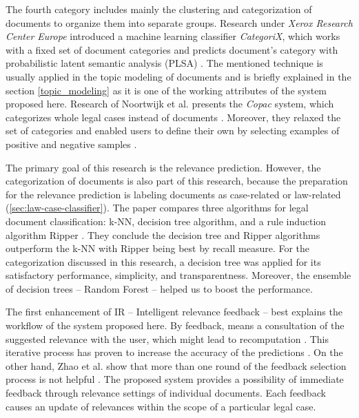 \documentclass[
  digital, %
  notable,   %
  nolof,     %
  nolot,     %
]{fithesis3}
\begin{document}
The fourth category includes mainly the clustering and categorization of documents to organize them into separate groups.
Research under \textit{Xerox Research Center Europe} introduced a machine learning classifier \textit{CategoriX}, which works with a fixed set of document categories and predicts document's category with probabilistic latent semantic analysis (PLSA) \cite{barnett2009classification}.
The mentioned technique is usually applied in the topic modeling of documents and is briefly explained in the section \ref{topic_modeling} as it is one of the working attributes of the system proposed here.
Research of Noortwijk et al. presents the \textit{Copac} system, which categorizes whole legal cases instead of documents \cite{van2006ranking}.
Moreover, they relaxed the set of categories and enabled users to define their own by selecting examples of positive and negative samples \cite{van2006ranking}.

The primary goal of this research is the relevance prediction.
However, the categorization of documents is also part of this research, because the preparation for the relevance prediction is labeling documents as case-related or law-related (\ref{sec:law-case-classifier}).
The paper  compares three algorithms for legal document classification: k-NN, decision tree algorithm, and a rule induction algorithm Ripper \cite{thompson2001automatic}.
They conclude the decision tree and Ripper algorithms outperform the k-NN with Ripper being best by recall measure.
For the categorization discussed in this research, a decision tree was applied for its satisfactory performance, simplicity, and transparentness.
Moreover, the ensemble of decision trees -- Random Forest -- helped us to boost the performance.

The first enhancement of IR -- Intelligent relevance feedback -- best explains the workflow of the system proposed here.
By feedback, \citeauthor{Conrad2010ediscovery} means a consultation of the suggested relevance with the user, which might lead to recomputation \cite{Conrad2010ediscovery}.
This iterative process has proven to increase the accuracy of the predictions \cite{Conrad2010ediscovery}.
On the other hand, Zhao et al. show that more than one round of the feedback selection process is not helpful \cite{zhao2009feedback}.
The proposed system provides a possibility of immediate feedback through relevance settings of individual documents.
Each feedback causes an update of relevances within the scope of a particular legal case.
\end{document}
